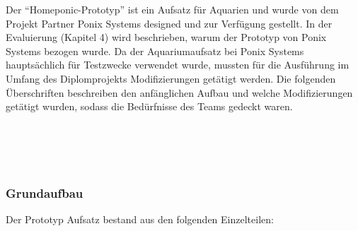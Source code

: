 Der "`Homeponic-Prototyp"' ist ein Aufsatz für Aquarien und wurde von dem Projekt Partner Ponix Systems designed und zur Verfügung gestellt. In der Evaluierung (Kapitel 4) wird beschrieben, warum der Prototyp von Ponix Systems bezogen wurde. Da der Aquariumaufsatz bei Ponix Systems hauptsächlich für Testzwecke verwendet wurde, mussten für die Ausführung im Umfang des Diplomprojekts Modifizierungen getätigt werden. Die folgenden Überschriften beschreiben den anfänglichen Aufbau und welche Modifizierungen getätigt wurden, sodass die Bedürfnisse des Teams gedeckt waren.\\
\mbox{} \\
\mbox{} \\
\mbox{} \\
\mbox{} \\
\newpage
\subsubsection{Grundaufbau}
Der Prototyp Aufsatz bestand aus den folgenden Einzelteilen:
